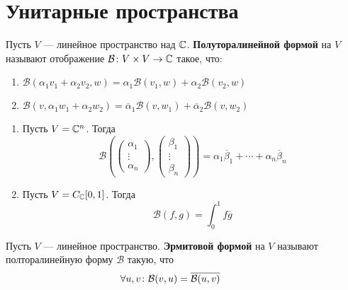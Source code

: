 \documentclass[../main.tex]{subfiles}
\begin{document}
\section{Унитарные пространства}

\begin{definition}
  Пусть $V$ --- линейное пространство над $\mathbb{C}$. \textbf{Полуторалинейной формой} на $V$ называют отображение $\mathcal{B}\colon V \times V \to \mathbb{C}$ такое, что:
  \begin{enumerate}
    \item $\mathcal{B}(\alpha_1 v_1 + \alpha_2 v_2, w) = \alpha_1 \mathcal{B}(v_1, w) + \alpha_2 \mathcal{B}(v_2, w)$
    \item $\mathcal{B}(v, \alpha_1 w_1 + \alpha_2 w_2) = \overline{\alpha}_1 \mathcal{B}(v, w_1) + \overline{\alpha}_2 \mathcal{B}(v, w_2)$
  \end{enumerate}
\end{definition}

\begin{examples}
  \begin{enumerate}
    \item Пусть $V = \mathbb{C}^n$. Тогда
    \begin{equation*}
      \mathcal{B}\left(
        \begin{pmatrix}
          \alpha_1 \\
          \vdots \\
          \alpha_n
        \end{pmatrix},
        \begin{pmatrix}
          \beta_1 \\
          \vdots \\
          \beta_n
        \end{pmatrix}
      \right) =
      \alpha_1 \overline{\beta}_1 + \dotsb + \alpha_n \overline{\beta}_n
    \end{equation*}

    \item Пусть $V = C_{\mathbb{C}}[0, 1]$. Тогда
    \begin{equation*}
      \mathcal{B}(f, g) = \int_{0}^{1} f \overline{g}
    \end{equation*}
  \end{enumerate}
\end{examples}

\begin{definition}
  Пусть $V$ --- линейное пространство. \textbf{Эрмитовой формой} на $V$ называют полторалинейную форму $\mathcal{B}$ такую, что
  \begin{equation*}
    \forall u,v\colon
    \mathcal{B}(v, u) = \overline{\mathcal{B}(u, v)}
    \hphantom{\forall u,v\colon}
  \end{equation*}
\end{definition}
\end{document}
